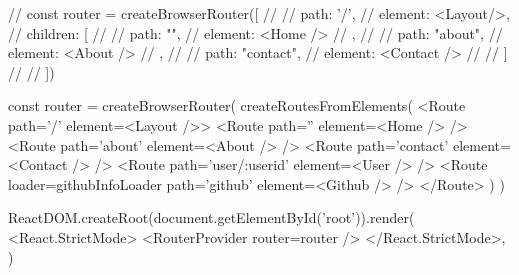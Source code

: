                     // const router = createBrowserRouter([
                    //   {
                    //     path: '/',
                    //     element: <Layout/>,
                    //     children: [
                    //       {
                    //         path: "",
                    //         element: <Home />
                    //       },
                    //       {
                    //         path: "about",
                    //         element: <About />
                    //       },
                    //       {
                    //         path: "contact",
                    //         element: <Contact />
                    //       }
                    //     ]
                    //   }
                    // ])

                    const router = createBrowserRouter(
                    createRoutesFromElements(
                        <Route path='/' element={<Layout />}>
                        <Route path='' element={<Home />} />
                        <Route path='about' element={<About />} />
                        <Route path='contact' element={<Contact />} />
                        <Route path='user/:userid' element={<User />} />
                        <Route 
                        loader={githubInfoLoader}
                        path='github' 
                        element={<Github />}
                        />
                        </Route>
                    )
                    )

                    ReactDOM.createRoot(document.getElementById('root')).render(
                    <React.StrictMode>
                        <RouterProvider router={router} />
                    </React.StrictMode>,
                    )